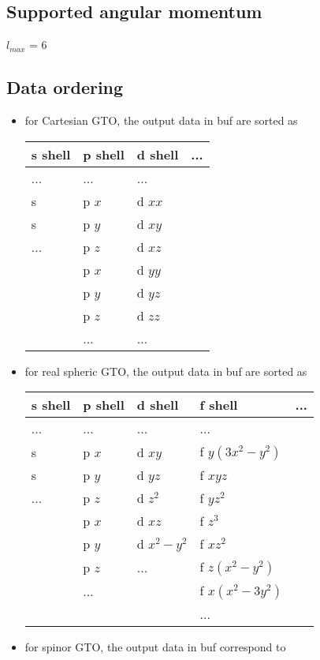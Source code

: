 \documentclass[]{article}
\begin{document}
\subsection{Supported angular
momentum}\label{supported-angular-momentum}

$l_{max}$ = 6

\subsection{Data ordering}\label{data-ordering}

\begin{itemize}
\itemsep1pt\parskip0pt
\item
  for Cartesian GTO, the output data in buf are sorted as\\

  \begin{tabular}{l|l|l|l}
  \hline
      s shell & p shell & d shell & ... \\
  \hline
      ...     & ...     & ...     & \\
      s       & p $x$   & d $xx$  & \\
      s       & p $y$   & d $xy$  & \\
      ...     & p $z$   & d $xz$  & \\
              & p $x$   & d $yy$  & \\
              & p $y$   & d $yz$  & \\
              & p $z$   & d $zz$  & \\
              & ...     & ...     & \\
  \hline
  \end{tabular}
\item
  for real spheric GTO, the output data in buf are sorted as\\

  \begin{tabular}{l|l|l|l|l}
  \hline
      s shell & p shell & d shell     & f shell         & ... \\
  \hline
      ...     & ...     & ...         & ...             & \\
      s       & p $x$   & d $xy     $ & f $y(3x^2-y^2)$ & \\
      s       & p $y$   & d $yz     $ & f $xyz        $ & \\
      ...     & p $z$   & d $z^2    $ & f $yz^2       $ & \\
              & p $x$   & d $xz     $ & f $z^3        $ & \\
              & p $y$   & d $x^2-y^2$ & f $xz^2       $ & \\
              & p $z$   & ...         & f $z(x^2-y^2) $ & \\
              & ...     &             & f $x(x^2-3y^2)$ & \\
              &         &             & ...             & \\
  \hline
  \end{tabular}
\item
  for spinor GTO, the output data in buf correspond to\\


\end{itemize}
\end{document}
